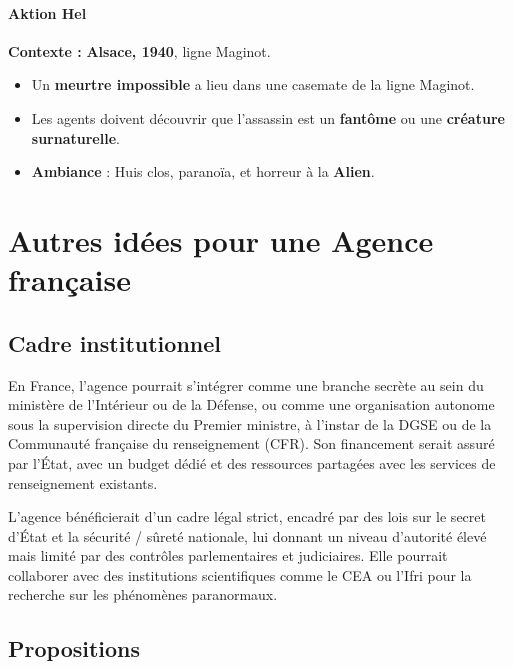 \documentclass[10pt,a5paper,twoside]{book}
\begin{document}
\subsubsection{Aktion Hel}
\textbf{Contexte :} \textbf{Alsace, 1940}, ligne Maginot.
\begin{itemize}
	\item Un \textbf{meurtre impossible} a lieu dans une casemate de la ligne Maginot.
	\item Les agents doivent découvrir que l'assassin est un \textbf{fantôme} ou une \textbf{créature surnaturelle}.
	\item \textbf{Ambiance} : Huis clos, paranoïa, et horreur à la \textbf{Alien}.
\end{itemize}

\newpage


\chapter{Autres idées pour une Agence française}

\section{Cadre institutionnel}

En France, l'agence pourrait s'intégrer comme une branche secrète au sein du ministère de l'Intérieur ou de la Défense, ou comme une organisation autonome sous la supervision directe du Premier ministre, à l'instar de la DGSE ou de la Communauté française du renseignement (CFR). Son financement serait assuré par l'État, avec un budget dédié et des ressources partagées avec les services de renseignement existants.

L'agence bénéficierait d'un cadre légal strict, encadré par des lois sur le secret d'État et la sécurité / sûreté nationale, lui donnant un niveau d'autorité élevé mais limité par des contrôles parlementaires et judiciaires. Elle pourrait collaborer avec des institutions scientifiques comme le CEA ou l'Ifri pour la recherche sur les phénomènes paranormaux.

\newpage

\section{Propositions}
\end{document}
